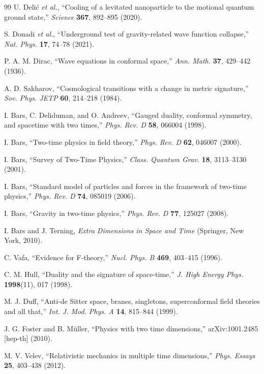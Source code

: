 \documentclass[11pt,a4paper]{article}
\theoremstyle{definition}
\theoremstyle{remark}
\begin{document}
\begin{thebibliography}{99}
 U. Deli\'c \textit{et al.}, ``Cooling of a levitated nanoparticle to the motional quantum ground state,'' \textit{Science} \textbf{367}, 892--895 (2020).

 S. Donadi \textit{et al.}, ``Underground test of gravity-related wave function collapse,'' \textit{Nat. Phys.} \textbf{17}, 74--78 (2021).

 P. A. M. Dirac, ``Wave equations in conformal space,'' \textit{Ann. Math.} \textbf{37}, 429--442 (1936).

 A. D. Sakharov, ``Cosmological transitions with a change in metric signature,'' \textit{Sov. Phys. JETP} \textbf{60}, 214--218 (1984).

 I. Bars, C. Deliduman, and O. Andreev, ``Gauged duality, conformal symmetry, and spacetime with two times,'' \textit{Phys. Rev. D} \textbf{58}, 066004 (1998).

 I. Bars, ``Two-time physics in field theory,'' \textit{Phys. Rev. D} \textbf{62}, 046007 (2000).

 I. Bars, ``Survey of Two-Time Physics,'' \textit{Class. Quantum Grav.} \textbf{18}, 3113--3130 (2001).

 I. Bars, ``Standard model of particles and forces in the framework of two-time physics,'' \textit{Phys. Rev. D} \textbf{74}, 085019 (2006).

 I. Bars, ``Gravity in two-time physics,'' \textit{Phys. Rev. D} \textbf{77}, 125027 (2008).

 I. Bars and J. Terning, \textit{Extra Dimensions in Space and Time} (Springer, New York, 2010).

 C. Vafa, ``Evidence for F-theory,'' \textit{Nucl. Phys. B} \textbf{469}, 403--415 (1996).

 C. M. Hull, ``Duality and the signature of space-time,'' \textit{J. High Energy Phys.} \textbf{1998}(11), 017 (1998).

 M. J. Duff, ``Anti-de Sitter space, branes, singletons, superconformal field theories and all that,'' \textit{Int. J. Mod. Phys. A} \textbf{14}, 815--844 (1999).

 J. G. Foster and B. M\"uller, ``Physics with two time dimensions,'' arXiv:1001.2485 [hep-th] (2010).

 M. V. Velev, ``Relativistic mechanics in multiple time dimensions,'' \textit{Phys. Essays} \textbf{25}, 403--438 (2012).


\end{thebibliography}
\end{document}

